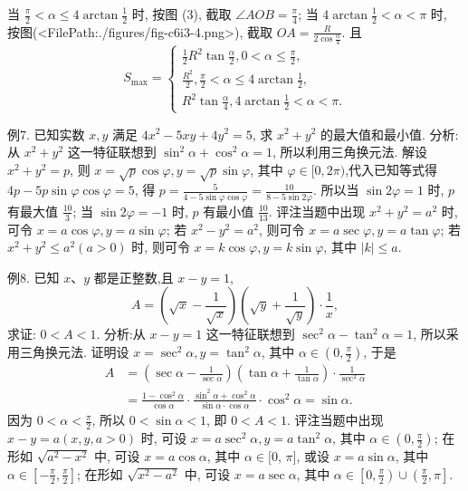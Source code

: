 当 $\frac{\pi}{2}<\alpha \leqslant 4 \arctan \frac{1}{2}$ 时, 按图 (3), 截取 $\angle A O B=\frac{\pi}{4}$;
当 $4 \arctan \frac{1}{2}<\alpha<\pi$ 时, 按图(<FilePath:./figures/fig-c6i3-4.png>), 截取 $O A=\frac{R}{2 \cos \frac{\alpha}{4}}$. 且
$$
S_{\max }=\left\{\begin{array}{l}
\frac{1}{2} R^2 \tan \frac{\alpha}{2}, 0<\alpha \leqslant \frac{\pi}{2}, \\
\frac{R^2}{2}, \frac{\pi}{2}<\alpha \leqslant 4 \arctan \frac{1}{2}, \\
R^2 \tan \frac{\alpha}{4}, 4 \arctan \frac{1}{2}<\alpha<\pi .
\end{array}\right.
$$



例7. 已知实数 $x, y$ 满足 $4 x^2-5 x y+4 y^2=5$, 求 $x^2+y^2$ 的最大值和最小值.
分析:从 $x^2+y^2$ 这一特征联想到 $\sin ^2 \alpha+\cos ^2 \alpha=1$, 所以利用三角换元法.
解设 $x^2+y^2=p$, 则 $x=\sqrt{p} \cos \varphi, y=\sqrt{p} \sin \varphi$, 其中 $\varphi \in[0,2 \pi)$,代入已知等式得 $4 p-5 p \sin \varphi \cos \varphi=5$, 得 $p=\frac{5}{4-5 \sin \varphi \cos \varphi}=\frac{10}{8-5 \sin 2 \varphi}$. 所以当 $\sin 2 \varphi=1$ 时, $p$ 有最大值 $\frac{10}{3}$;
当 $\sin 2 \varphi=-1$ 时, $p$ 有最小值 $\frac{10}{13}$.
评注当题中出现 $x^2+y^2=a^2$ 时, 可令 $x=a \cos \varphi, y=a \sin \varphi$; 若 $x^2- y^2=a^2$, 则可令 $x=a \sec \varphi, y=a \tan \varphi$; 若 $x^2+y^2 \leqslant a^2(a>0)$ 时, 则可令 $x=k \cos \varphi, y=k \sin \varphi$, 其中 $|k| \leqslant a$.



例8. 已知 $x 、 y$ 都是正整数,且 $x-y=1$,
$$
A=\left(\sqrt{x}-\frac{1}{\sqrt{x}}\right)\left(\sqrt{y}+\frac{1}{\sqrt{y}}\right) \cdot \frac{1}{x},
$$
求证: $0<A<1$.
分析:从 $x-y=1$ 这一特征联想到 $\sec ^2 \alpha-\tan ^2 \alpha=1$, 所以采用三角换元法.
证明设 $x=\sec ^2 \alpha, y=\tan ^2 \alpha$, 其中 $\alpha \in\left(0, \frac{\pi}{2}\right)$, 于是
$$
\begin{aligned}
A & =\left(\sec \alpha-\frac{1}{\sec \alpha}\right)\left(\tan \alpha+\frac{1}{\tan \alpha}\right) \cdot \frac{1}{\sec ^2 \alpha} \\
& =\frac{1-\cos ^2 \alpha}{\cos \alpha} \cdot \frac{\sin ^2 \alpha+\cos ^2 \alpha}{\sin \alpha \cdot \cos \alpha} \cdot \cos ^2 \alpha=\sin \alpha .
\end{aligned}
$$
因为 $0<\alpha<\frac{\pi}{2}$, 所以 $0<\sin \alpha<1$, 即 $0<A<1$.
评注当题中出现 $x-y=a(x, y, a>0)$ 时, 可设 $x=a \sec ^2 \alpha, y= a \tan ^2 \alpha$, 其中 $\alpha \in\left(0, \frac{\pi}{2}\right)$; 在形如 $\sqrt{a^2-x^2}$ 中, 可设 $x=a \cos \alpha$, 其中 $\alpha \in[0$, $\pi]$, 或设 $x=a \sin \alpha$, 其中 $\alpha \in\left[-\frac{\pi}{2}, \frac{\pi}{2}\right]$; 在形如 $\sqrt{x^2-a^2}$ 中, 可设 $x=a \sec \alpha$, 其中 $\alpha \in\left[0, \frac{\pi}{2}\right) \cup\left(\frac{\pi}{2}, \pi\right]$.



